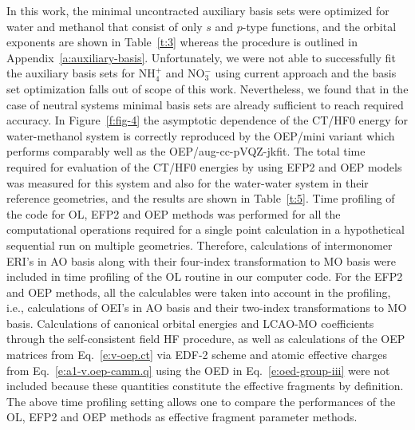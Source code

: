 \documentclass[aip,jcp,amsmath,amssymb,reprint,floatfix]{revtex4-1}
\begin{document}
In this work, the minimal uncontracted auxiliary basis sets were optimized for water and methanol
that consist of only $s$ and $p$\hyp{}type functions,
and the orbital exponents are shown in Table~\ref{t:3}
whereas the procedure is outlined in Appendix~\ref{a:auxiliary-basis}.
Unfortunately, we were not able to successfully fit the auxiliary basis sets
for NH$_4^+$ and NO$_3^-$ using current approach
and the basis set optimization falls out of scope of this work.
Nevertheless, we found that in the case of neutral systems minimal basis
sets are already sufficient to reach required accuracy.
In Figure~\ref{f:fig-4} the asymptotic dependence of the CT/HF0 energy
for water\hyp{}methanol system is correctly reproduced by the OEP/mini variant
which
performs comparably well as the OEP/aug-cc-pVQZ-jkfit. 
The total time required for evaluation of the CT/HF0 energies by using EFP2 and OEP
models was measured for this system and also for the water\hyp{}water system in their reference geometries,
and the results are shown in Table~\ref{t:5}. 
Time profiling of the code for OL, EFP2 and OEP methods was performed 
for all the computational operations required for a
single point calculation in a hypothetical sequential run on multiple
geometries. Therefore, calculations of intermonomer 
ERI's in AO basis 
along with their four\hyp{}index transformation to MO basis were included in
time profiling of the OL routine in our computer code. For the EFP2 
and OEP methods, all the calculables were taken into account in the profiling,
i.e., calculations of OEI's in AO basis and their two\hyp{}index transformations
to MO basis. Calculations of canonical orbital 
energies and LCAO\hyp{}MO coefficients through the self\hyp{}consistent field
HF procedure, as well as calculations of the
OEP matrices from Eq.~\eqref{e:v-oep.ct} 
via EDF-2 scheme and atomic effective charges from Eq.~\eqref{e:a1-v.oep-camm.q}
using the OED in Eq.~\eqref{e:oed-group-iii}
were not included because these quantities constitute the effective fragments
by definition.
The above time profiling setting allows one to compare the performances
of the OL, EFP2 and OEP methods as effective fragment parameter methods.
\end{document}
